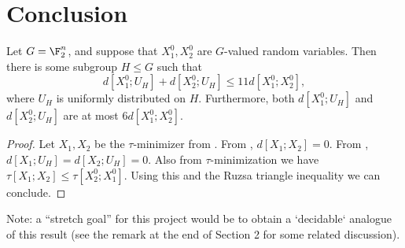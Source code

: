 \section{Conclusion}

\begin{theorem}\label{entropy-pfr}
  \leanok
  Let $G = \F_2^n$, and suppose that $X^0_1, X^0_2$ are $G$-valued random variables.
  Then there is some subgroup $H \leq G$ such that
  \[
    d[X^0_1;U_H] + d[X^0_2;U_H] \le 11 d[X^0_1;X^0_2],
  \]
  where $U_H$ is uniformly distributed on $H$.
  Furthermore, both $d[X^0_1;U_H]$ and $d[X^0_2;U_H]$ are at most $6 d[X^0_1;X^0_2]$.
\end{theorem}

\begin{proof}  \leanok  Let $X_1, X_2$ be the $\tau$-minimizer from .  From , $d[X_1;X_2]=0$.  From , $d[X_1;U_H] = d[X_2; U_H] = 0$.  Also from $\tau$-minimization we have $\tau[X_1;X_2] \leq \tau[X^0_2;X^0_1]$.  Using this and the Ruzsa triangle inequality we can conclude.
\end{proof}

Note: a ``stretch goal'' for this project would be to obtain a `decidable` analogue of this result (see the remark at the end of Section 2 for some related discussion).
